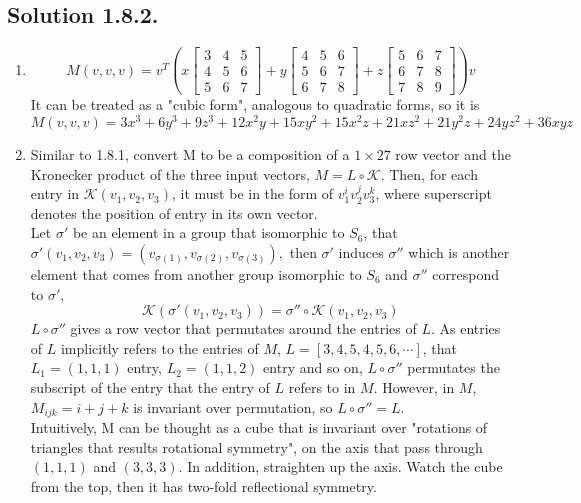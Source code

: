 \documentclass{article}
\begin{document}
\subsection*{Solution 1.8.2.}
\begin{enumerate}
    \item 
    \[M(v,v,v) = v^T\left(x\left[\begin{array}{ccc}
    3 & 4 & 5 \\
    4 & 5 & 6 \\
    5 & 6 & 7
    \end{array}\right] + y\left[\begin{array}{ccc}
    4 & 5 & 6 \\
    5 & 6 & 7 \\
    6 & 7 & 8
    \end{array}\right] +
    z\left[\begin{array}{ccc}
    5 & 6 & 7 \\
    6 & 7 & 8 \\
    7 & 8 & 9
    \end{array}\right]\right)v\]
    It can be treated as a "cubic form", analogous to quadratic forms, so it is
    \[M(v,v,v) = 3x ^ 3 + 6y ^ 3 + 9z ^ 3 + 12x ^ 2 y + 15xy ^ 2 + 15 x ^ 2 z + 21xz ^ 2 + 21y ^ 2 z + 24yz ^ 2 + 36xyz\]
    \item Similar to 1.8.1, convert M to be a composition of a $1\times 27$ row vector and the Kronecker product of the three input vectors, $M = L \circ \mathcal{K}$. Then, for each entry in $\mathcal{K}(v_1, v_2, v_3)$, 
    it must be in the form of $v_1 ^ i v_2 ^ j v_3 ^ k$, where superscript denotes the position of entry in its own vector. \\
    Let $\sigma'$ be an element in a group that isomorphic to $S_6$, that $\sigma'(v_1, v_2, v_3) = (v_{\sigma(1)}, v_{\sigma(2)}, v_{\sigma(3)}),$ then $\sigma'$ induces $\sigma''$ which is another element that comes from another group isomorphic to $S_6$ and $\sigma''$ correspond to $\sigma'$, 
    \[\mathcal{K}(\sigma'(v_1,v_2,v_3)) = \sigma''\circ \mathcal{K}(v_1, v_2, v_3)\]
    $L \circ \sigma''$ gives a row vector that permutates around the entries of $L$. As entries of $L$ implicitly refers to the entries of $M$, $L = [3,4,5,4,5,6,\cdots]$, that $L_1 =(1,1,1)$ entry, $L_2 = (1,1,2)$ entry and so on, $L\circ \sigma''$ permutates the subscript of the entry that the entry of $L$ refers to in $M$. However, in $M$, $M_{ijk} = i + j + k$  is invariant over permutation, so $L \circ \sigma'' = L$.\\
    Intuitively, M can be thought as a cube that is invariant over "rotations of triangles that results rotational symmetry", on the axis that pass through $(1,1,1)$ and $(3,3,3)$. In addition, straighten up the axis. Watch the cube from the top, then it has two-fold reflectional symmetry.

\end{enumerate}
\end{document}
